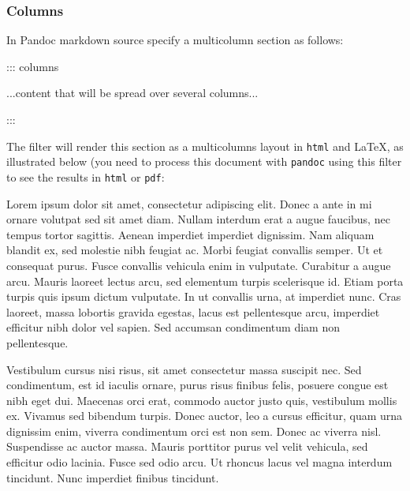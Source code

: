 \documentclass[
]{article}
\newenvironment{Shaded}{}{}
\newcommand{\NormalTok}[1]{#1}
\begin{document}
\hypertarget{columns-1}{%
\subsubsection{Columns}\label{columns-1}}

In Pandoc markdown source specify a multicolumn section as follows:

\begin{Shaded}
\begin{Highlighting}[]
\NormalTok{::: columns}

\NormalTok{...content that will be spread over several columns...}

\NormalTok{:::}
\end{Highlighting}
\end{Shaded}

The filter will render this section as a multicolumns layout in
\texttt{html} and LaTeX, as illustrated below (you need to process this
document with \texttt{pandoc} using this filter to see the results in
\texttt{html} or \texttt{pdf}:

{\raggedcolumns\begin{multicols}{2}

Lorem ipsum dolor sit amet, consectetur adipiscing elit. Donec a ante in
mi ornare volutpat sed sit amet diam. Nullam interdum erat a augue
faucibus, nec tempus tortor sagittis. Aenean imperdiet imperdiet
dignissim. Nam aliquam blandit ex, sed molestie nibh feugiat ac. Morbi
feugiat convallis semper. Ut et consequat purus. Fusce convallis
vehicula enim in vulputate. Curabitur a augue arcu. Mauris laoreet
lectus arcu, sed elementum turpis scelerisque id. Etiam porta turpis
quis ipsum dictum vulputate. In ut convallis urna, at imperdiet nunc.
Cras laoreet, massa lobortis gravida egestas, lacus est pellentesque
arcu, imperdiet efficitur nibh dolor vel sapien. Sed accumsan
condimentum diam non pellentesque.

Vestibulum cursus nisi risus, sit amet consectetur massa suscipit nec.
Sed condimentum, est id iaculis ornare, purus risus finibus felis,
posuere congue est nibh eget dui. Maecenas orci erat, commodo auctor
justo quis, vestibulum mollis ex. Vivamus sed bibendum turpis. Donec
auctor, leo a cursus efficitur, quam urna dignissim enim, viverra
condimentum orci est non sem. Donec ac viverra nisl. Suspendisse ac
auctor massa. Mauris porttitor purus vel velit vehicula, sed efficitur
odio lacinia. Fusce sed odio arcu. Ut rhoncus lacus vel magna interdum
tincidunt. Nunc imperdiet finibus tincidunt.

\end{multicols}
}
\end{document}
